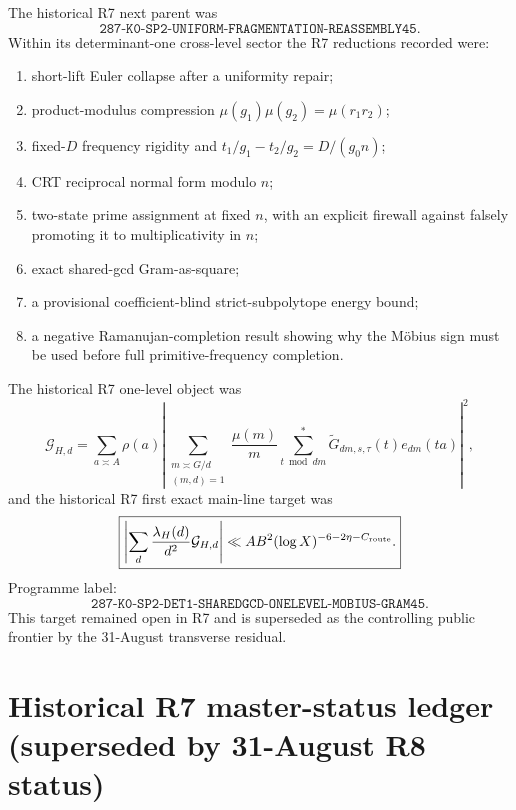 \documentclass[11pt]{article}
\theoremstyle{definition}
\newcommand{\1}{\mathbf 1}
\begin{document}
The historical R7 next parent was
\[
\boxed{\texttt{287-K0-SP2-UNIFORM-FRAGMENTATION-REASSEMBLY45}}.
\]
Within its determinant-one cross-level sector the R7 reductions recorded were:
\begin{enumerate}[leftmargin=1.7em]
\item short-lift Euler collapse after a uniformity repair;
\item product-modulus compression $\mu(g_1)\mu(g_2)=\mu(r_1r_2)$;
\item fixed-$D$ frequency rigidity and $t_1/g_1-t_2/g_2=D/(g_0n)$;
\item CRT reciprocal normal form modulo $n$;
\item two-state prime assignment at fixed $n$, with an explicit firewall against falsely
  promoting it to multiplicativity in $n$;
\item exact shared-gcd Gram-as-square;
\item a provisional coefficient-blind strict-subpolytope energy bound;
\item a negative Ramanujan-completion result showing why the M\"obius sign must be used
  before full primitive-frequency completion.
\end{enumerate}

The historical R7 one-level object was
\[
\mathcal G_{H,d}
=
\sum_{a\asymp A}\rho(a)
\left|
\sum_{\substack{m\asymp G/d\\(m,d)=1}}
\frac{\mu(m)}m
\sum_{t\bmod dm}^{*}
\widetilde G_{dm,s,\tau}(t)e_{dm}(ta)
\right|^2,
\]
and the historical R7 first exact main-line target was
\[
\boxed{
\left|
\sum_d\frac{\lambda_H(d)}{d^2}\mathcal G_{H,d}
\right|
\ll
AB^2(\log X)^{-6-2\eta-C_{\rm route}}.
}
\]
Programme label:
\[
\boxed{
\texttt{287-K0-SP2-DET1-SHAREDGCD-ONELEVEL-MOBIUS-GRAM45}.
}
\]
This target remained open in R7 and is superseded as the controlling public frontier by the 31-August transverse residual.


\section{Historical R7 master-status ledger (superseded by 31-August R8 status)}
\label{sec:master-ledger}
\end{document}
